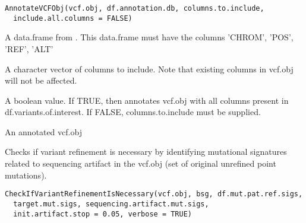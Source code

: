 \documentclass[letterpaper]{book}
\begin{document}
%
\begin{Usage}
\begin{verbatim}
AnnotateVCFObj(vcf.obj, df.annotation.db, columns.to.include,
  include.all.columns = FALSE)
\end{verbatim}
\end{Usage}
%
\begin{Arguments}
\begin{ldescription}
\item[\code{vcf.obj}] 

\item[\code{df.annotation.db}] A data.frame from .
This data.frame must have the columns 'CHROM', 'POS', 'REF', 'ALT'

\item[\code{columns.to.include}] A character vector of columns to include.
Note that existing columns in vcf.obj will not be affected.

\item[\code{include.all.columns}] A boolean value. If TRUE, then annotates vcf.obj with
all columns present in df.variants.of.interest. If FALSE, columns.to.include must be
supplied.
\end{ldescription}
\end{Arguments}
%
\begin{Value}
An annotated vcf.obj
\end{Value}
%
\begin{Description}\relax
Checks if variant refinement is necessary by identifying mutational signatures
related to sequencing artifact in the vcf.obj (set of original unrefined point mutations).
\end{Description}
%
\begin{Usage}
\begin{verbatim}
CheckIfVariantRefinementIsNecessary(vcf.obj, bsg, df.mut.pat.ref.sigs,
  target.mut.sigs, sequencing.artifact.mut.sigs,
  init.artifact.stop = 0.05, verbose = TRUE)
\end{verbatim}
\end{Usage}
%
\end{document}
